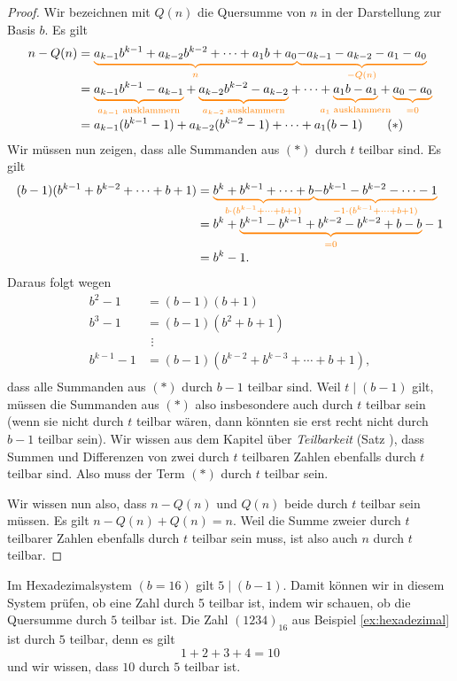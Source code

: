 \documentclass[../../main.tex]{subfiles}
\begin{document}
\begin{proof}
    Wir bezeichnen mit $Q(n)$ die Quersumme von $n$ in der Darstellung zur Basis $b$. Es gilt
    \begin{align*}
        n-Q(n)&=\colorbrace{a_{k-1}b^{k-1}+a_{k-2}b^{k-2}+\dots+a_1b+a_0}{n}\colorbrace{-a_{k-1}-a_{k-2}-a_1-a_0}{-Q(n)}\\
        &=\colorbrace{a_{k-1}b^{k-1}-a_{k-1}}{a_{k-1}\text{ ausklammern}}+\colorbrace{a_{k-2}b^{k-2}-a_{k-2}}{a_{k-2}\text{ ausklammern}}+\dots+\colorbrace{a_1b-a_1}{a_1\text{ ausklammern}}+\colorbrace{a_0-a_0}{=0}\\
        &=a_{k-1}(b^{k-1}-1)+a_{k-2}(b^{k-2}-1)+\dots+a_1(b-1)\tag{$*$}
    \end{align*}
    Wir müssen nun zeigen, dass alle Summanden aus $(*)$ durch $t$ teilbar sind. Es gilt
    \begin{align*}
        (b-1)(b^{k-1}+b^{k-2}+\cdots+b+1)
        &=\colorbrace{b^k+b^{k-1}+\cdots+b}{b\cdot(b^{k-1}+\cdots+b+1)}\colorbrace{-b^{k-1}-b^{k-2}-\cdots-1}{-1\cdot(b^{k-1}+\cdots+b+1)}\\
        &=b^k+\colorbrace{b^{k-1}-b^{k-1}+b^{k-2}-b^{k-2}+b-b}{=0}-1\\
        &=b^k-1.
    \end{align*}
    Daraus folgt wegen
    \begin{align*}
        b^2-1&=(b-1)(b+1)\\
        b^3-1&=(b-1)(b^2+b+1)\\
        &~\,\vdots\\
        b^{k-1}-1&=(b-1)(b^{k-2}+b^{k-3}+\cdots+b+1),\\
    \end{align*}
    dass alle Summanden aus $(*)$ durch $b-1$ teilbar sind. Weil $t\mid(b-1)$ gilt, müssen die Summanden aus $(*)$ also insbesondere auch durch $t$ teilbar sein (wenn sie nicht durch $t$ teilbar wären, dann könnten sie erst recht nicht durch $b-1$ teilbar sein). Wir wissen aus dem Kapitel über \emph{Teilbarkeit} (Satz \mayberef), dass Summen und Differenzen von zwei durch $t$ teilbaren Zahlen ebenfalls durch $t$ teilbar sind. Also muss der Term $(*)$ durch $t$ teilbar sein. 
    
    Wir wissen nun also, dass $n-Q(n)$ und $Q(n)$ beide durch $t$ teilbar sein müssen. Es gilt $n-Q(n)+Q(n)=n$. Weil die Summe zweier durch $t$ teilbarer Zahlen ebenfalls durch $t$ teilbar sein muss, ist also auch $n$ durch $t$ teilbar.
\end{proof}
\begin{advexample}{}
    Im Hexadezimalsystem $(b=16)$ gilt $5\mid(b-1)$. Damit können wir in diesem System prüfen, ob eine Zahl durch 5 teilbar ist, indem wir schauen, ob die Quersumme durch $5$ teilbar ist. Die Zahl $(1234)_{16}$ aus Beispiel \ref{ex:hexadezimal} ist durch $5$ teilbar, denn es gilt
    \[1+2+3+4=10\]
    und wir wissen, dass $10$ durch $5$ teilbar ist.
\end{advexample}
\end{document}
